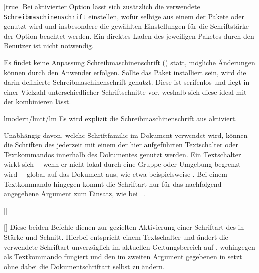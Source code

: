 \begin{Declaration*}{}
\begin{Declaration*}{}
\begin{Declaration*}{}
\begin{Declaration}[v2.06]{}[true]%
\printdeclarationlist%
%
%
%
Bei aktivierter Option  lässt sich zusätzlich die verwendete
\texttt{Schreibmaschinenschrift} einstellen, wofür selbige aus einem der Pakete 
 oder  genutzt wird und insbesondere die 
gewählten Einstellungen für die Schriftstärke der Option  
beachtet werden. Ein direktes Laden des jeweiligen Paketes durch den Benutzer 
ist nicht notwendig.
%
\begin{values}{}
\itemfalse
  Es findet keine Anpassung Schreibmaschinenschrift () statt, 
  mögliche Änderungen können durch den Anwender erfolgen.
  Sollte das Paket  installiert sein, wird die darin definierte 
  Schreibmaschinenschrift genutzt. Diese ist serifenlos und liegt in einer 
  Vielzahl unterschiedlicher Schriftschnitte vor, weshalb sich diese ideal mit 
  der \OpenSans kombinieren lässt.
\item[lmodern/lmtt/lm]
  Es wird explizit die Schreibmaschinenschrift aus  aktiviert. 
\end{values}
\end{Declaration}



%
%
%
Unabhängig davon, welche Schriftfamilie im Dokument verwendet wird, können die 
Schriften des \CDs jederzeit mit einem der hier aufgeführten Textschalter oder 
Textkommandos innerhalb des Dokumentes genutzt werden. Ein Textschalter wirkt 
sich~-- wenn er nicht lokal durch eine Gruppe oder Umgebung begrenzt wird~-- 
global auf das Dokument aus, wie etwa beispielsweise . Bei 
einem Textkommando hingegen kommt die Schriftart nur für das nachfolgend 
angegebene Argument zum Einsatz, wie bei []. 
%
\begin{Declaration}[v2.04]{[]}
\begin{Declaration}[v2.04]{%
  []%
}
\printdeclarationlist
Diese beiden Befehle dienen zur gezielten Aktivierung einer Schriftart des \CDs 
in Stärke und Schnitt. Hierbei entspricht  einem Textschalter und 
ändert die verwendete Schriftart unverzüglich im aktuellen Geltungsbereich auf 
, wohingegen  als Textkommando fungiert und den 
im zweiten Argument gegebenen  in  setzt ohne 
dabei die Dokumentschriftart selbst zu ändern.


\end{Declaration}
\end{Declaration}
\end{Declaration*}
\end{Declaration*}
\end{Declaration*}
